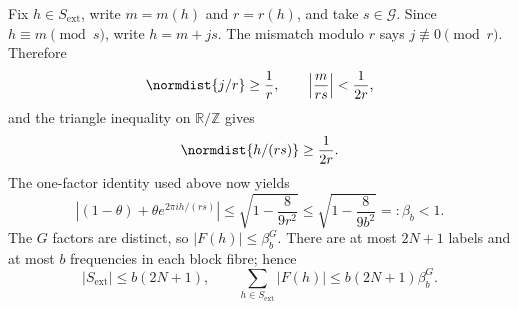 Fix $h\in S_{\mathrm{ext}}$, write $m=m(h)$ and $r=r(h)$, and take
$s\in\mathcal G$.  Since $h\equiv m\pmod s$, write $h=m+js$.  The mismatch
modulo $r$ says $j\not\equiv0\pmod r$.  Therefore
\[
 \normdist{j/r}\ge\frac1r,
 \qquad
 \left|\frac{m}{rs}\right|<\frac1{2r},
\]
and the triangle inequality on $\mathbb R/\mathbb Z$ gives
\[
 \normdist{h/(rs)}\ge\frac1{2r}.
\]
The one-factor identity used above now yields
\begin{equation}\label{eq:gadget-factor}
 \left|(1-\theta)+\theta e^{2\pi ih/(rs)}\right|
 \le\sqrt{1-\frac8{9r^2}}
 \le\sqrt{1-\frac8{9b^2}}=:\beta_b<1.
\end{equation}
The $G$ factors are distinct, so $|F(h)|\le\beta_b^G$.
There are at most $2N+1$ labels and at most $b$ frequencies in each block
fibre; hence
\begin{equation}\label{eq:extra-count}
 |S_{\mathrm{ext}}|\le b(2N+1),
 \qquad
 \sum_{h\in S_{\mathrm{ext}}}|F(h)|
 \le b(2N+1)\beta_b^G.
\end{equation}

